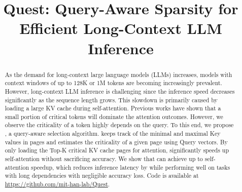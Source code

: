 \title{Quest: Query-Aware Sparsity for Efficient Long-Context LLM Inference}




\printAffiliationsAndNotice{\icmlEqualContribution} %

\begin{abstract}
As the demand for long-context large language models (LLMs) increases, models with context windows of up to 128K or 1M tokens are becoming increasingly prevalent. However, long-context LLM inference is challenging since the inference speed decreases significantly as the sequence length grows. This slowdown is primarily caused by loading a large KV cache during self-attention. 
Previous works have shown that a small portion of critical tokens will dominate the attention outcomes. However, we observe the criticality of a token highly depends on the query. To this end, we propose \method, a query-aware \kvc{} selection algorithm. \method keeps track of the minimal and maximal Key values in \kvc pages and estimates the criticality of a given page using Query vectors. By only loading the Top-K critical KV cache pages for attention, \method significantly speeds up self-attention without sacrificing accuracy. We show that \method can achieve up to \selfspeedup self-attention speedup, which reduces inference latency by \eespeedup while performing well on tasks with long dependencies with negligible accuracy loss. Code is available at \url{https://github.com/mit-han-lab/Quest}.
\end{abstract}
